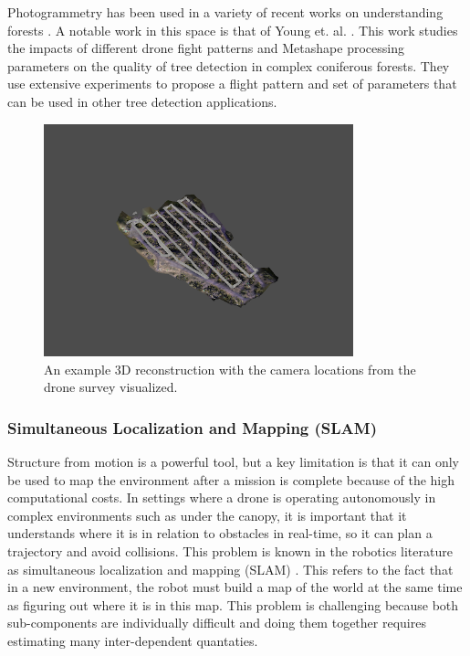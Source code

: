 Photogrammetry has been used in a variety of recent works on understanding forests \cite{Swayze2021InfluenceDensity, doi:10.1139/cjfr-2020-0433}. A notable work in this space is that of Young et. al. \cite{Young2022}. This work studies the impacts of different drone fight patterns and Metashape processing parameters on the quality of tree detection in complex coniferous forests. They use extensive experiments to propose a flight pattern and set of parameters that can be used in other tree detection applications.
\begin{figure}
    \centering
    \includegraphics[width=0.8\textwidth, trim={4cm 3cm 4cm 4cm}, clip]{figs/methods/structure_from_motion/camera estimation.png}
    \caption{An example 3D reconstruction with the camera locations from the drone survey visualized.}
    \label{fig:background:camera_locations}
\end{figure}


\subsubsection{Simultaneous Localization and Mapping (SLAM)}
Structure from motion is a powerful tool, but a key limitation is that it can only be used to map the environment after a mission is complete because of the high computational costs. In settings where a drone is operating autonomously in complex environments such as under the canopy, it is important that it understands where it is in relation to obstacles in real-time, so it can plan a trajectory and avoid collisions. This problem is known in the robotics literature as simultaneous localization and mapping (SLAM) \cite{durrant2006simultaneous}.
This refers to the fact that in a new environment, the robot must build a map of the world at the same time as figuring out where it is in this map.  This problem is challenging because both sub-components are individually difficult and doing them together requires estimating many inter-dependent quantaties.

